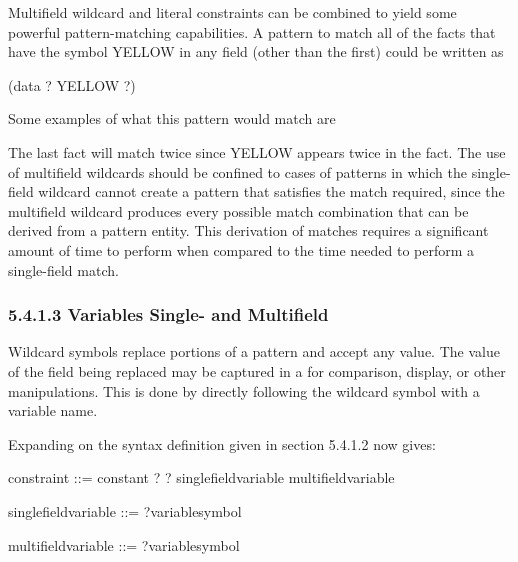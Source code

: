 \documentclass[letterpaper,10pt,english]{sphinxmanual}
\begin{document}
Multifield wildcard and literal constraints can be combined to yield
some powerful pattern-matching capabilities. A pattern to match all of
the facts that have the symbol YELLOW in any field (other than the
first) could be written as

\begin{sphinxVerbatim}[commandchars=\\\{\}]
(data \PYGZdl{}? YELLOW \PYGZdl{}?)
\end{sphinxVerbatim}

Some examples of what this pattern would match are

\begin{sphinxVerbatim}[commandchars=\\\{\}]
    
  
  
 
   
\end{sphinxVerbatim}

The last fact will match twice since YELLOW appears twice in the fact.
The use of multifield wildcards should be confined to cases of patterns
in which the single-field wildcard cannot create a pattern that
satisfies the match required, since the multifield wildcard produces
every possible match combination that can be derived from a pattern
entity. This derivation of matches requires a significant amount of time
to perform when compared to the time needed to perform a single-field
match.


\subsubsection{5.4.1.3 Variables Single- and Multifield}
\label{\detokenize{defrule:variables-single-and-multifield}}
Wildcard symbols replace portions of a pattern and accept any value. The
value of the field being replaced may be captured in a  for
comparison, display, or other manipulations. This is done by directly
following the wildcard symbol with a variable name.

Expanding on the syntax definition given in section 5.4.1.2 now gives:


\begin{sphinxVerbatim}[commandchars=\\\{\}]
\PYGZlt{}constraint\PYGZgt{} ::= \PYGZlt{}constant\PYGZgt{} \textbar{} ? \textbar{} \PYGZdl{}? \textbar{}
  \PYGZlt{}single\PYGZhy{}field\PYGZhy{}variable\PYGZgt{} \textbar{}
  \PYGZlt{}multifield\PYGZhy{}variable\PYGZgt{}

\PYGZlt{}single\PYGZhy{}field\PYGZhy{}variable\PYGZgt{} ::= ?\PYGZlt{}variable\PYGZhy{}symbol\PYGZgt{}

\PYGZlt{}multifield\PYGZhy{}variable\PYGZgt{} ::= \PYGZdl{}?\PYGZlt{}variable\PYGZhy{}symbol\PYGZgt{}
\end{sphinxVerbatim}
\end{document}
